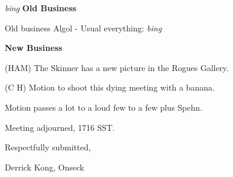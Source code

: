 \vspace{0.15in}
{\em bing\/}  {\bf Old Business}

Old business Algol - Usual everything: {\em bing\/}

\vspace{0.15in}
{\bf New Business}

(HAM) The Skinner has a new picture in the Rogues Gallery.

(C H) Motion to shoot this dying meeting with a banana.

Motion passes a lot to a loud few to a few plus Spehn.

Meeting adjourned, 1716 SST.

\vspace{0.15in}
\begin{center}
Respectfully submitted,

Derrick Kong, Onseck
\end{center}

